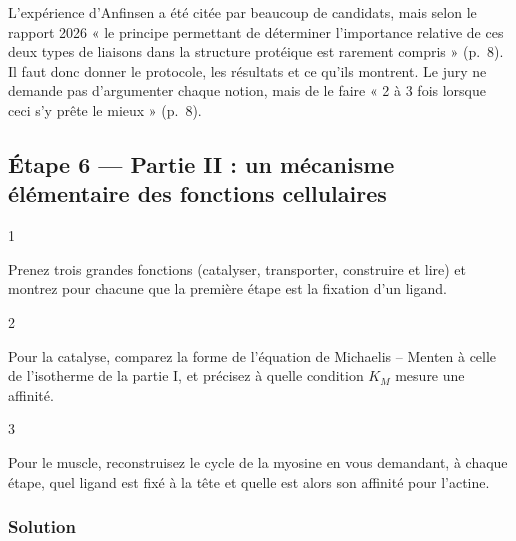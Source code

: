 \documentclass[11pt,a4paper]{article}
\begin{document}
\begin{jury}

L'expérience d'Anfinsen a été citée par beaucoup de candidats, mais selon le rapport 2026 « le principe permettant de déterminer l'importance relative de ces deux types de liaisons dans la structure protéique est rarement compris » (p.~8). Il faut donc donner le protocole, les résultats et ce qu'ils montrent. Le jury ne demande pas d'argumenter chaque notion, mais de le faire « 2 à 3 fois lorsque ceci s'y prête le mieux » (p.~8).

\end{jury}

\hypertarget{uxe9tape-6-partie-ii-un-muxe9canisme-uxe9luxe9mentaire-des-fonctions-cellulaires}{%
\subsection{Étape 6 --- Partie II : un mécanisme élémentaire des fonctions cellulaires}\label{uxe9tape-6-partie-ii-un-muxe9canisme-uxe9luxe9mentaire-des-fonctions-cellulaires}}

\begin{indication}{1}

Prenez trois grandes fonctions (catalyser, transporter, construire et lire) et montrez pour chacune que la première étape est la fixation d'un ligand.

\end{indication}

\begin{indication}{2}

Pour la catalyse, comparez la forme de l'équation de Michaelis -- Menten à celle de l'isotherme de la partie I, et précisez à quelle condition \(K_M\) mesure une affinité.

\end{indication}

\begin{indication}{3}

Pour le muscle, reconstruisez le cycle de la myosine en vous demandant, à chaque étape, quel ligand est fixé à la tête et quelle est alors son affinité pour l'actine.

\end{indication}

\hypertarget{solution-5}{%
\subsubsection{Solution}\label{solution-5}}
\end{document}

